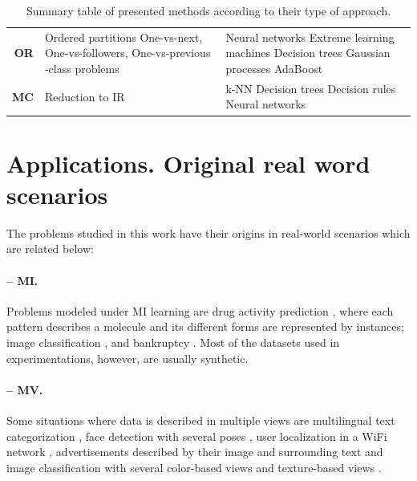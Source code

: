 \begin{table}[ht]
\begin{tabular}{r p{} p{}}
\textbf{OR} & 
Ordered partitions \cite{ord-simple} \newline One-vs-next, One-vs-followers, One-vs-previous \cite{ord-survey} \newline 3-class problems \cite{ord-survey}& 
Neural networks \cite{or-nn,or-nn2} \newline Extreme learning machines \cite{or-elm,or-elm2} \newline Decision trees \cite{or-knn-dt} \newline Gaussian processes \cite{or-gp} \newline AdaBoost \cite{or-ada} \\
\textbf{MC} & 
Reduction to IR \cite{monotonicity}& 
k-NN \cite{mc-knn}\newline Decision trees \cite{mc-trees}\newline Decision rules \cite{mc-rules,mc-rules2}\newline Neural networks \cite{mc-monnets}\\
\toprule
\end{tabular}
\caption{\label{p3tbl.methods}Summary table of presented methods according to their type of approach.}
\end{table}


\section{Applications. Original real word scenarios}
\label{p3sec:applications}

The problems studied in this work have their origins in real-world scenarios which are related below:

\paragraph{-- MI.} Problems modeled under MI learning are drug activity prediction \cite{mi-apr}, where each pattern describes a molecule and its different forms are represented by instances; image classification \cite{mic-taxonomy}, and bankruptcy \cite{ami-bank}. Most of the datasets used in experimentations, however, are usually synthetic.

\paragraph{-- MV.} Some situations where data is described in multiple views are multilingual text categorization \cite{amv-multilingual}, face detection with several poses \cite{amv-face}, user localization in a WiFi network \cite{amv-wifi}, advertisements described by their image and surrounding text \cite{amv-ads-webkb} and image classification with several color-based views and texture-based views \cite{amv-corel}.

